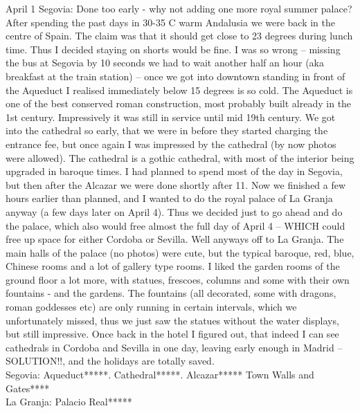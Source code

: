 April 1 
Segovia: Done too early - why not adding one more royal summer palace?\\
After spending the past days in 30-35 C warm Andalusia we were back in the centre of Spain. The claim was that it should get close to 23 degrees during lunch time. Thus I decided staying on shorts would be fine. I was so wrong -- missing the bus at Segovia by 10 seconds we had to wait another half an hour (aka breakfast at the train station) -- once we got into downtown standing in front of the Aqueduct I realised immediately below 15 degrees is so cold. The Aqueduct is one of the best conserved roman construction, most probably built already in the 1st century. Impressively it was still in service until mid 19th century. We got into the cathedral so early, that we were in before they started charging the entrance fee, but once again I was impressed by the cathedral (by now photos were allowed). The cathedral is a gothic cathedral, with most of the interior being upgraded in baroque times. I had planned to spend most of the day in Segovia, but then after the Alcazar we were done shortly after 11.  Now we finished a few hours earlier than planned, and I wanted to do the royal palace of La Granja anyway (a few days later on April 4). Thus we decided just to go ahead and do the palace, which also would free almost the full day of April 4 -- WHICH could free up space for either Cordoba or Sevilla. Well anyways off to La Granja. The main halls of the palace (no photos) were cute, but the typical baroque, red, blue, Chinese rooms and a lot of gallery type rooms. I liked the garden rooms of the ground floor a lot more, with statues, frescoes, columns and some with their own fountains - and the gardens. The fountains (all decorated, some with dragons, roman goddesses etc) are only running in certain intervals, which we unfortunately missed, thus we just saw the statues without the water displays, but still impressive. Once back in the hotel I figured out, that indeed I can see cathedrals in Cordoba and Sevilla in one day, leaving early enough in Madrid -- SOLUTION!!, and the holidays are totally saved. \\

Segovia: Aqueduct*****.
Cathedral*****.
Alcazar*****
Town Walls and Gates****\\
La Granja: 
Palacio Real*****\\

